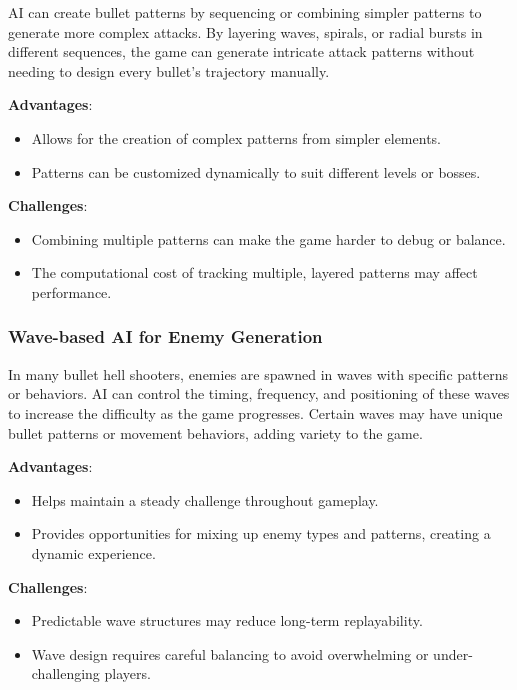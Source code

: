 \documentclass{article} %
\begin{document}
AI can create bullet patterns by sequencing or combining simpler patterns to generate more complex attacks. By layering waves, spirals, or radial bursts in different sequences, the game can generate intricate attack patterns without needing to design every bullet’s trajectory manually.

\textbf{Advantages}:
\begin{itemize}
	\item Allows for the creation of complex patterns from simpler elements.
	\item Patterns can be customized dynamically to suit different levels or bosses.
\end{itemize}

\textbf{Challenges}:
\begin{itemize}
	\item Combining multiple patterns can make the game harder to debug or balance.
	\item The computational cost of tracking multiple, layered patterns may affect performance.
\end{itemize}

\subsubsection{Wave-based AI for Enemy Generation}

In many bullet hell shooters, enemies are spawned in waves with specific patterns or behaviors. AI can control the timing, frequency, and positioning of these waves to increase the difficulty as the game progresses. Certain waves may have unique bullet patterns or movement behaviors, adding variety to the game.

\textbf{Advantages}:
\begin{itemize}
	\item Helps maintain a steady challenge throughout gameplay.
	\item Provides opportunities for mixing up enemy types and patterns, creating a dynamic experience.
\end{itemize}

\textbf{Challenges}:
\begin{itemize}
	\item Predictable wave structures may reduce long-term replayability.
	\item Wave design requires careful balancing to avoid overwhelming or under-challenging players.
\end{itemize}
\end{document}
